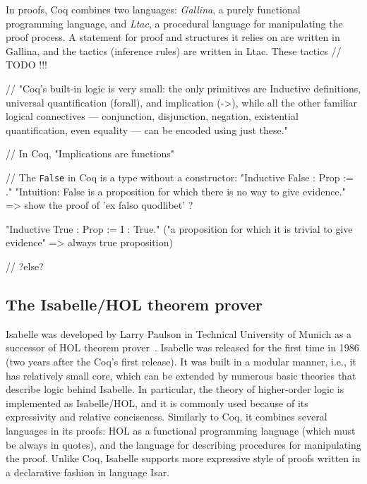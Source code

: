 \documentclass[article]{aaltoseries}
\begin{document}
In proofs, Coq combines two languages: \textit{Gallina}, a purely functional programming language, and \textit{Ltac}, a procedural language for manipulating the proof process. A statement for proof and structures it relies on are written in Gallina, and the tactics (inference rules) are written in Ltac. These tactics  // TODO !!! %


// "Coq's built-in logic is very small: the only primitives are Inductive definitions, universal quantification (forall), and implication (->), while all the other familiar logical connectives — conjunction, disjunction, negation, existential quantification, even equality — can be encoded using just these."

// In Coq, "Implications are functions"

// The \texttt{False} in Coq is a type without a constructor:
	"Inductive False : Prop := ." 
"Intuition: False is a proposition for which there is no way to give evidence."
=> show the proof of 'ex falso quodlibet' ?

"Inductive True : Prop := I : True." ("a proposition for which it is trivial to give evidence" => always true proposition)



// ?else?




\subsection{The Isabelle/HOL theorem prover}
\label{sec:prover_isabelle}

Isabelle was developed by Larry Paulson in Technical University of Munich as a successor of HOL theorem prover~\cite{tool_HOL}. Isabelle was released for the first time in 1986 (two years after the Coq's first release). It was built in a modular manner, i.e., it has relatively small core, which can be extended by numerous basic theories that describe logic behind Isabelle. In particular, the theory of higher-order logic is implemented as Isabelle/HOL, and it is commonly used because of its expressivity and relative conciseness. Similarly to Coq, it combines several languages in its proofs: HOL as a functional programming language (which must be always in quotes), and the language for describing procedures for manipulating the proof. Unlike Coq, Isabelle supports more expressive style of proofs written in a declarative fashion in language Isar.
\end{document}

